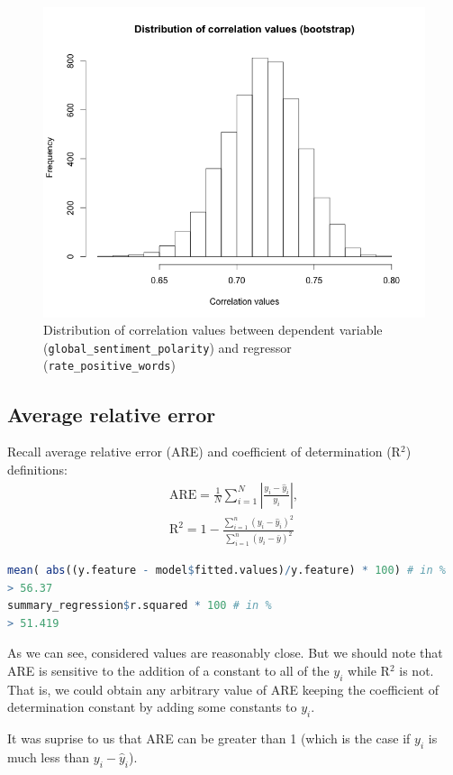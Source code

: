 \begin{figure}[h!]
\centering
\includegraphics[width=0.7\linewidth]{images/bootsrap_correlation}
\caption{Distribution of correlation values between dependent variable (\texttt{global\_sentiment\_polarity}) and regressor (\texttt{rate\_positive\_words})}
\label{fig:bootsrap_correlation}
\end{figure}



\subsection{Average relative error}

Recall average relative error (ARE) and coefficient of determination (R$^2$) definitions:
\begin{gather*}
\text{ARE} = \frac{1}{N} \sum_{i=1}^{N}{\left\vert \frac{y_i - \hat{y}_i}{y_i} \right\vert}, \\
\text{R}^2 = 1 - \frac{\sum\limits_{i=1}^n (y_i - \hat{y}_i)^2}
                      {\sum\limits_{i=1}^n (y_i - \bar{y})^2}
\end{gather*}


\begin{lstlisting}[language=R]
mean( abs((y.feature - model$fitted.values)/y.feature) * 100) # in %
> 56.37 
summary_regression$r.squared * 100 # in %
> 51.419 
\end{lstlisting}

As we can see, considered values are reasonably close. But we should note that ARE is sensitive to the addition of a constant to all of the $y_i$ while R$^2$ is not. That is, we could obtain any arbitrary value of ARE keeping the coefficient of determination constant by adding some constants to $y_i$. 

It was suprise to us that ARE can be greater than 1 (which is the case if $y_i$ is much less than $y_i - \hat{y}_i$). 

